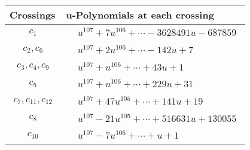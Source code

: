 \documentclass[1p]{elsarticle_modified}
\theoremstyle{definition}
\begin{document}
\begin{tabular}{m{50pt}|m{274pt}}
Crossings & \hspace{64pt}u-Polynomials at each crossing \\
\hline $$\begin{aligned}c_{1}\end{aligned}$$&$\begin{aligned}
&u^{107}+7 u^{106}+\cdots-3628491 u-687859
\end{aligned}$\\
\hline $$\begin{aligned}c_{2},c_{6}\end{aligned}$$&$\begin{aligned}
&u^{107}+2 u^{106}+\cdots-142 u+7
\end{aligned}$\\
\hline $$\begin{aligned}c_{3},c_{4},c_{9}\end{aligned}$$&$\begin{aligned}
&u^{107}+u^{106}+\cdots+43 u+1
\end{aligned}$\\
\hline $$\begin{aligned}c_{5}\end{aligned}$$&$\begin{aligned}
&u^{107}+u^{106}+\cdots+229 u+31
\end{aligned}$\\
\hline $$\begin{aligned}c_{7},c_{11},c_{12}\end{aligned}$$&$\begin{aligned}
&u^{107}+47 u^{105}+\cdots+141 u+19
\end{aligned}$\\
\hline $$\begin{aligned}c_{8}\end{aligned}$$&$\begin{aligned}
&u^{107}-21 u^{105}+\cdots+516631 u+130055
\end{aligned}$\\
\hline $$\begin{aligned}c_{10}\end{aligned}$$&$\begin{aligned}
&u^{107}-7 u^{106}+\cdots+u+1
\end{aligned}$\\
\hline
\end{tabular}\\~\\
\newpage\renewcommand{\arraystretch}{1}
\end{document}
